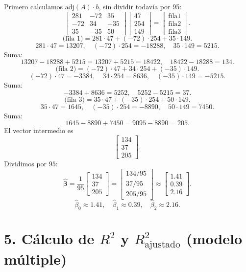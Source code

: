 \documentclass[10pt,a4paper]{article}
\begin{document}
\begin{enumerate}
Primero calculamos 
\(\mathrm{adj}(A)\cdot b\),
sin dividir todavía por 95:
\[
\begin{bmatrix}
281 & -72 & 35\\
-72 & 34 & -35\\
35 & -35 & 50
\end{bmatrix}
\begin{bmatrix}
47\\
254\\
149
\end{bmatrix}
=
\begin{bmatrix}
\text{fila1}\\
\text{fila2}\\
\text{fila3}
\end{bmatrix}.
\]
\[
\text{(fila 1)} 
= 281\cdot47 + (-72)\cdot254 + 35\cdot149.
\]
\[
281\cdot47=13207,\quad
(-72)\cdot254=-18288,\quad
35\cdot149=5215.
\]
Suma:
\[
13207 -18288 +5215= 13207 +5215=18422,\quad 18422-18288=134.
\]
\[
\text{(fila 2)}
= (-72)\cdot47 +34\cdot254 +(-35)\cdot149.
\]
\[
(-72)\cdot47=-3384,\quad
34\cdot254=8636,\quad
(-35)\cdot149=-5215.
\]
Suma:
\[
-3384+8636=5252,\quad 5252-5215=37.
\]
\[
\text{(fila 3)}
= 35\cdot47 +(-35)\cdot254 +50\cdot149.
\]
\[
35\cdot47=1645,\quad
(-35)\cdot254=-8890,\quad
50\cdot149=7450.
\]
Suma:
\[
1645-8890 +7450=9095-8890=205.
\]
El vector intermedio es
\[
\begin{bmatrix}
134\\
37\\
205
\end{bmatrix}.
\]
Dividimos por $95$:
\[
\hat{\boldsymbol{\beta}}
=
\frac{1}{95}
\begin{bmatrix}
134\\
37\\
205
\end{bmatrix}
=
\begin{bmatrix}
134/95\\
37/95\\
205/95
\end{bmatrix}
\approx
\begin{bmatrix}
1.41\\
0.39\\
2.16
\end{bmatrix}.
\]
\[
\boxed{
\hat{\beta}_0 \approx 1.41,
\quad
\hat{\beta}_1 \approx 0.39,
\quad
\hat{\beta}_2 \approx 2.16.
}
\]


\section*{5. Cálculo de $R^2$ y $R_{\text{ajustado}}^2$ (modelo múltiple)}


\end{enumerate}
\end{document}
